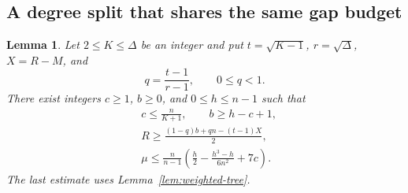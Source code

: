 \documentclass[11pt,a4paper]{article}
\newtheorem{lemma}[theorem]{Lemma}
\theoremstyle{remark}\newtheorem{remark}[theorem]{Remark}
\begin{document}
\subsection{A degree split that shares the same gap budget}

\begin{lemma}\label{lem:chm-concentration}
Let $2\le K\le\Delta$ be an integer and put
$t=\sqrt{K-1}$, $r=\sqrt\Delta$, $X=R-M$, and
\[
 q=\frac{t-1}{r-1},\qquad 0\le q<1.
\]
There exist integers $c\ge1$, $b\ge0$, and $0\le h\le n-1$ such that
\begin{align}
 &c\le\frac n{K+1},\qquad b\ge h-c+1,\label{eq:chm-concentration-counts}\\
 &R\ge\frac{(1-q)b+qn-(t-1)X}{2},\label{eq:chm-refined-split}\\
 &\mu\le\frac n{n-1}
       \left(\frac h2-\frac{h^3-h}{6n^2}+7c\right).
       \label{eq:chm-quotient}
\end{align}
The last estimate uses Lemma~\ref{lem:weighted-tree}.
\end{lemma}
\end{document}
